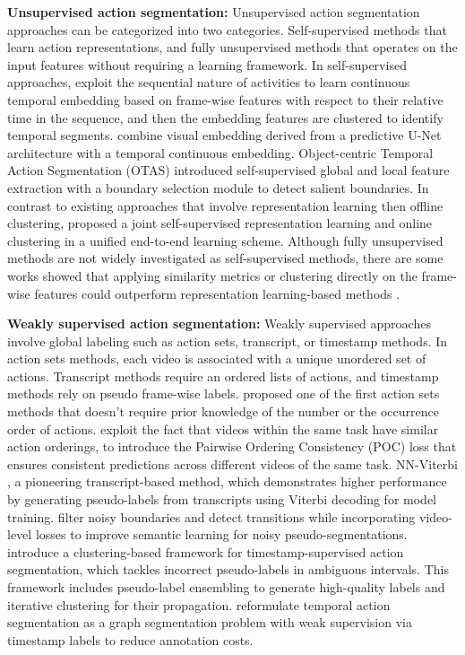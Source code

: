 \textbf{Unsupervised action segmentation:} Unsupervised action segmentation approaches can be categorized into two categories. Self-supervised methods that learn action representations, and fully unsupervised methods that operates on the input features without requiring a learning framework. In self-supervised approaches, \citet{kukleva2019unsupervised} exploit the sequential nature of activities to learn continuous temporal embedding based on frame-wise features with respect to their relative time in the sequence, and then the embedding features are clustered to identify temporal segments. \citet{vidalmata2021joint} combine visual embedding derived from a predictive U-Net architecture with a temporal continuous embedding. Object-centric Temporal Action Segmentation (OTAS) \cite{li2024otas} introduced self-supervised global and local feature extraction with a boundary selection module to detect salient boundaries. In contrast to existing approaches that involve representation learning then offline clustering, \citet{kumar2022unsupervised} proposed a joint self-supervised representation learning and online clustering in a unified end-to-end learning scheme. Although fully unsupervised methods are not widely investigated as self-supervised methods, there are some works  showed that applying similarity metrics or clustering directly on the frame-wise features could outperform representation learning-based methods \cite{sarfraz2019efficient,sarfraz2021temporally,du2022fast}. 

\textbf{Weakly supervised action segmentation:} Weakly supervised approaches involve global labeling such as action sets, transcript, or timestamp methods. In action sets methods,  each video is associated with a unique unordered set of actions.  Transcript methods require an ordered lists of actions, and  timestamp methods rely on pseudo frame-wise labels. \citet{richard2018action} proposed one of the first action sets methods that doesn't require prior knowledge of the number or the occurrence order of actions. \citet{lu2022set} exploit the fact that videos within the same task have similar action orderings, to introduce the Pairwise Ordering Consistency (POC) loss that ensures consistent predictions across different videos of the same task. NN-Viterbi \cite{richard2018neuralnetwork}, a pioneering transcript-based method, which demonstrates higher performance by generating pseudo-labels from transcripts using Viterbi decoding for model training. \citet{xu2024efficient}  filter noisy boundaries and detect transitions while incorporating video-level losses to improve semantic learning for noisy pseudo-segmentations. \citet{du2023timestamp} introduce a clustering-based framework for timestamp-supervised action segmentation, which tackles incorrect pseudo-labels in ambiguous intervals. This framework includes pseudo-label ensembling to generate high-quality labels and iterative clustering for their propagation. \citet{hirsch2024random} reformulate temporal action segmentation as a graph segmentation problem with weak supervision via timestamp labels to reduce annotation costs.


